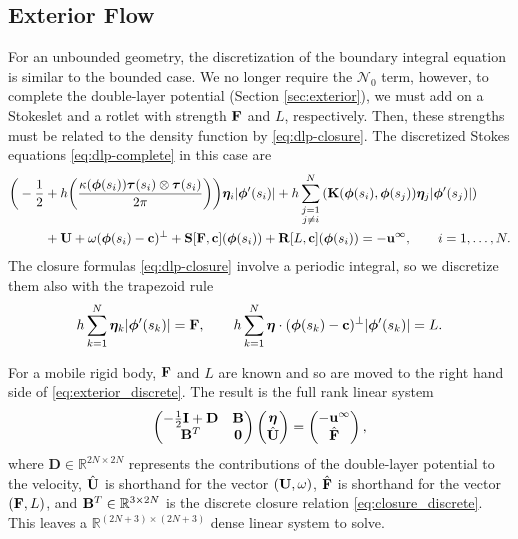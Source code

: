 \subsection{Exterior Flow}

For an unbounded geometry, the discretization of the boundary integral equation is similar to the bounded case. We no longer require the $\mathcal{N}_0$ term, however, to complete the double-layer potential (Section \ref{sec:exterior}), we must add on a Stokeslet and a rotlet with strength ${\mathbf{F}}$ and $L$, respectively. Then, these strengths must be related to the density function by \eqref{eq:dlp-closure}. The discretized Stokes equations \eqref{eq:dlp-complete} in this case are
\begin{equation}\label{eq:exterior_discrete}
\begin{aligned} \biggr(-\frac{1}{2} &+ h \bigg(\frac{\kappa(\bm{\phi}(s_i)) \bm{\tau}(s_i)\otimes\bm{\tau}(s_i)}{2\pi}\bigg)\biggr)\bm{\eta}_i |\bm{\phi}'(s_i)|+ h\sum_{\substack{j=1\\ j\ne i}}^{N}\left( \mathbf{K}(\bm{\phi}(s_i),\bm{\phi}(s_j))\bm{\eta}_j|\bm{\phi}'(s_j)| \right) \\&+ {\mathbf{U}} + \omega(\bm{\phi}(s_i) - {\mathbf{c}})^\perp + \mathbf{S}[{\mathbf{F}},{\mathbf{c}}](\bm{\phi}(s_i)) + \mathbf{R}[L,{\mathbf{c}}](\bm{\phi}(s_i)) = -{\mathbf{u}}^\infty, \qquad i=1,\hdots,N.\end{aligned}
\end{equation}
The closure formulas \eqref{eq:dlp-closure} involve a periodic integral, so we discretize them also with the trapezoid rule
\begin{equation}\label{eq:closure_discrete}
	h\sum\limits_{k=1}^N \bm{\eta}_k|\bm{\phi}'(s_k)| ={\mathbf{F}}, \qquad  h\sum\limits_{k=1}^N \bm{\eta}\cdot(\bm{\phi}(s_k) - {\mathbf{c}})^\perp|\bm{\phi}'(s_k)| = L.
\end{equation}

For a mobile rigid body, ${\mathbf{F}}$ and $L$ are known and so are moved to the right hand side of \eqref{eq:exterior_discrete}. The result is the full rank linear system
\[ \begin{pmatrix} -\frac{1}{2}\mathbf{I} + \mathbf{D} & \mathbf{B} \\ \mathbf{B}^T & \mathbf{0}\end{pmatrix} \begin{pmatrix} \bm{\eta} \\ \hat{\mathbf{U}}\end{pmatrix}  = \begin{pmatrix} -\mathbf{u}^\infty\\ \hat{{\mathbf{F}}}\end{pmatrix},\]
where $\mathbf{D}\in \mathbb{R}^{2N\times 2N}$ represents the contributions of the double-layer potential to the velocity, $\hat{{\mathbf{U}}}$ is shorthand for the vector $({\mathbf{U}}, \omega)$, $\hat{{\mathbf{F}}}$ is shorthand for the vector $({\mathbf{F}}, L)$, and ${\mathbf{B}}^T\in\mathbb{R}^{3\times 2N}$ is the discrete closure relation \eqref{eq:closure_discrete}. This leaves a $\mathbb{R}^{(2N+3)\times (2N+3)}$ dense linear system to solve. 

